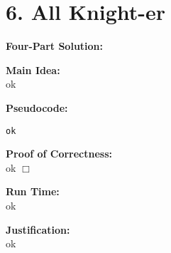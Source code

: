 \documentclass[11pt]{article}
\def\endproofmark{$\Box$}
\newenvironment{FourPartSolution}{\par{\bf Four-Part Solution:}}{\smallskip}
\newenvironment{mainIdea}{\par{\bf Main Idea:}}{\smallskip}
\newenvironment{pseudocode}{\par{\bf Pseudocode:}}{\smallskip}
\newenvironment{proofOfCorrectness}{\par{\bf Proof of Correctness:}}{\endproofmark\smallskip}
\newenvironment{runTime}{\par{\bf Run Time:}}{\smallskip}
\newenvironment{justification}{\par{\bf Justification:}}{\smallskip}
\begin{document}
\section*{6. All Knight-er}
\begin{FourPartSolution}
\\
\begin{mainIdea}
\\
ok
\end{mainIdea}
\\
\begin{pseudocode}
\begin{lstlisting}
ok
\end{lstlisting}
\end{pseudocode}
\begin{proofOfCorrectness}
\\
ok
\end{proofOfCorrectness}
\\
\begin{runTime}
\\
ok
\end{runTime}
\\
\begin{justification}
\\
ok
\end{justification}
\end{FourPartSolution}
\end{document}
